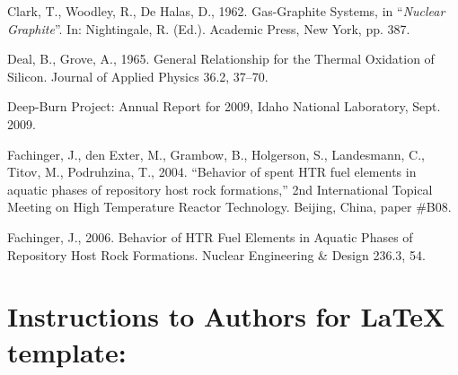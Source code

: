 \documentclass[5p,times,procedia]{elsarticle}
\begin{document}

%
%




 \begin{thebibliography}{00}


Clark, T., Woodley, R., De Halas, D., 1962. Gas-Graphite Systems, in ``{\it Nuclear Graphite}''. 
In: Nightingale, R. (Ed.). Academic Press, New York, pp. 387.

Deal, B., Grove, A., 1965. General Relationship for the Thermal Oxidation of Silicon. Journal of Applied Physics 36.2, 37--70.

Deep-Burn Project: Annual Report for 2009, Idaho National Laboratory, Sept. 2009.

Fachinger, J., den Exter, M., Grambow, B., Holgerson, S., Landesmann, C., Titov, M., Podruhzina, T., 2004. ``Behavior of spent HTR fuel elements in aquatic phases of repository host rock formations,'' 2nd International Topical Meeting on High Temperature Reactor Technology. Beijing, China, paper \#B08. 

Fachinger, J., 2006. Behavior
of HTR Fuel Elements in Aquatic Phases of Repository Host Rock Formations. Nuclear Engineering \& Design 236.3,      54.

 \end{thebibliography}

\clearpage\onecolumn

\normalMode

\section*{Instructions to Authors for LaTeX template:}
\end{document}
